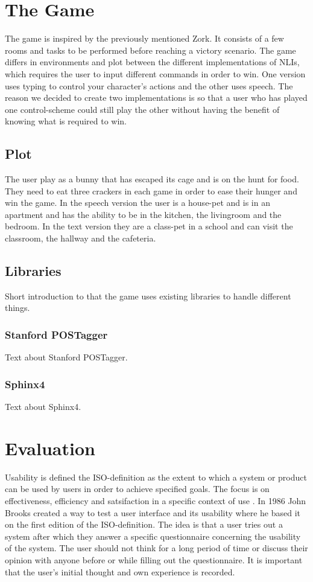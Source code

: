 \section{The Game}
The game is inspired by the previously mentioned Zork. It consists of a few rooms and tasks to be performed before reaching a victory scenario. The game differs in environments and plot between the different implementations of NLIs, which requires the user to input different commands in order to win. One version uses typing to control your character’s actions and the other uses speech. The reason we decided to create two implementations is so that a user who has played one control-scheme could still play the other without having the benefit of knowing what is required to win.

\subsection{Plot}
The user play as a bunny that has escaped its cage and is on the hunt for food. They need to eat three crackers in each game in order to ease their hunger and win the game. In the speech version the user is a house-pet and is in an apartment and has the ability to be in the kitchen, the livingroom and the bedroom. In the text version they are a class-pet in a school and can visit the classroom, the hallway and the cafeteria.

\subsection{Libraries}
Short introduction to that the game uses existing libraries to handle different things.

\subsubsection{Stanford POSTagger}
Text about Stanford POSTagger.

\subsubsection{Sphinx4}
Text about Sphinx4.

\section{Evaluation}
Usability is defined the ISO-definition as the extent to which a system or product can be used by users in order to achieve specified goals. The focus is on effectiveness, efficiency and satsifaction in a specific context of use \citep{ISO}. In 1986 John Brooks created a way to test a user interface and its usability where he based it on the first edition of the ISO-definition. The idea is that a user tries out a system after which they answer a specific questionnaire concerning the usability of the system. The user should not think for a long period of time or discuss their opinion with anyone before or while filling out the questionnaire. It is important that the user’s initial thought and own experience is recorded. \citep{Broo}

